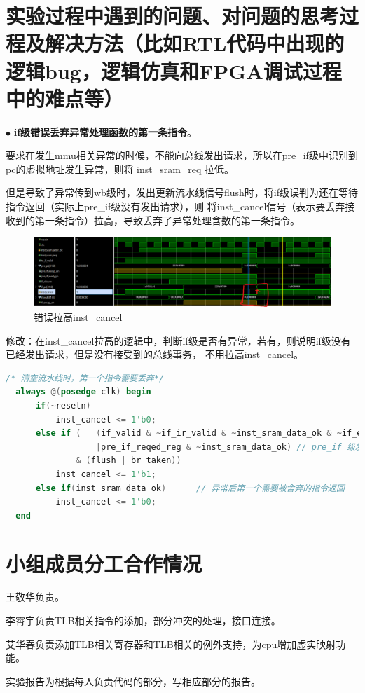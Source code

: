 \documentclass[11pt]{article}
\begin{document}
\section{实验过程中遇到的问题、对问题的思考过程及解决方法（比如RTL代码中出现的逻辑bug，逻辑仿真和FPGA调试过程中的难点等）}

\noindent
$\bullet$
\textbf{if级错误丢弃异常处理函数的第一条指令}。

要求在发生mmu相关异常的时候，不能向总线发出请求，所以在pre\_if级中识别到pc的虚拟地址发生异常，则将 inst\_sram\_req
拉低。

但是导致了异常传到wb级时，发出更新流水线信号flush时，将if级误判为还在等待指令返回（实际上pre\_if级没有发出请求），则
将inst_cancel信号（表示要丢弃接收到的第一条指令）拉高，导致丢弃了异常处理含数的第一条指令。
\begin{figure}[H]
  \centering
  \includegraphics[width=15cm]{fig/fig1.png}
  \caption{错误拉高inst\_cancel}
\end{figure}
修改：在inst\_cancel拉高的逻辑中，判断if级是否有异常，若有，则说明if级没有已经发出请求，但是没有接受到的总线事务，
不用拉高inst\_cancel。
\begin{lstlisting}[language=verilog]
  /* 清空流水线时，第一个指令需要丢弃*/
  always @(posedge clk) begin
      if(~resetn)
          inst_cancel <= 1'b0;
      else if (   (if_valid & ~if_ir_valid & ~inst_sram_data_ok & ~if_excep_en  // if正在等待指令返回， 加入if级是否有异常的判断
                  |pre_if_reqed_reg & ~inst_sram_data_ok) // pre_if 级发出请求，但是数据没有返回，也还没有进入if级
              & (flush | br_taken))
          inst_cancel <= 1'b1;
      else if(inst_sram_data_ok)      // 异常后第一个需要被舍弃的指令返回
          inst_cancel <= 1'b0;
  end
\end{lstlisting}


      
\vspace{1ex}

\section{小组成员分工合作情况}
王敬华负责。

李霄宇负责TLB相关指令的添加，部分冲突的处理，接口连接。

艾华春负责添加TLB相关寄存器和TLB相关的例外支持，为cpu增加虚实映射功能。

实验报告为根据每人负责代码的部分，写相应部分的报告。
\end{document}
